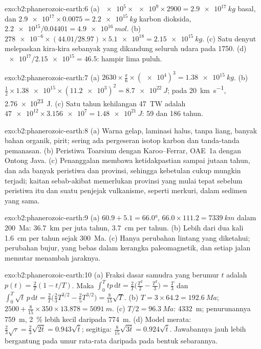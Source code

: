\begin{solution}{exo:b2:phanerozoic-earth:6}
(a) $\num{e5} \times \num{e9} \times 2900 = \qty{2.9e17}{kg}$ basal, dan $\num{2.9e17}
\times 0.0075 = \qty{2.2e15}{kg}$ karbon dioksida, $\num{2.2e15}/0.04401 = \qty{4.9e16}{mol}$.
(b) $\num{278e-6} \times (44.01/28.97) \times \num{5.1e18} = \qty{2.15e15}{kg}$. (c) Satu denyut
melepaskan kira-kira sebanyak yang dikandung seluruh udara pada 1750. (d) $\num{e17}/\num{2.15e15} = 46.5$: hampir lima puluh.
\end{solution}

\begin{solution}{exo:b2:phanerozoic-earth:7}
(a) $2630 \times \frac{\pi}{6} \times (\num{e4})^3 = \qty{1.38e15}{kg}$. (b) $\tfrac12 \times
\num{1.38e15} \times (\num{11.2e3})^2 = \qty{8.7e22}{J}$; pada \qty{20}{km.s^{-1}},
\qty{2.76e23}{J}. (c) Satu tahun kehilangan \qty{47}{TW} adalah $\num{47e12} \times \num{3.156e7} =
\qty{1.48e21}{J}$: 59 dan 186 tahun.
\end{solution}

\begin{solution}{exo:b2:phanerozoic-earth:8}
(a) Warna gelap, laminasi halus, tanpa liang, banyak bahan organik, pirit; sering ada pergeseran
isotop karbon dan tanda-tanda pemanasan. (b) Peristiwa Toarsium dengan Karoo--Ferrar, OAE~1a dengan
Ontong Java. (c) Penanggalan membawa ketidakpastian sampai jutaan tahun, dan ada banyak peristiwa dan
provinsi, sehingga kebetulan cukup mungkin terjadi; kaitan sebab-akibat memerlukan provinsi yang mulai
tepat sebelum peristiwa itu dan suatu penjejak vulkanisme, seperti merkuri, dalam sedimen yang sama.
\end{solution}

\begin{solution}{exo:b2:phanerozoic-earth:9}
(a) $60.9 + 5.1 = \ang{66.0}$, $66.0 \times 111.2 = \qty{7339}{km}$ dalam \qty{200}{Ma}:
\qty{36.7}{km} per juta tahun, \qty{3.7}{cm} per tahun. (b) Lebih dari dua kali
\qty{1.6}{cm} per tahun sejak \qty{300}{Ma}. (c) Hanya perubahan lintang yang diketahui; perubahan
bujur, yang bebas dalam kerangka paleomagnetik, dan setiap jalan memutar menambah jaraknya.
\end{solution}

\begin{solution}{exo:b2:phanerozoic-earth:10}
(a) Fraksi dasar samudra yang berumur $t$ adalah $p(t) = \frac2T(1 - t/T)$. Maka $\int_0^T tp\,\mathrm{d}t =
\frac2T\bigl(\frac{T^2}2 - \frac{T^2}3\bigr) = \frac T3$ dan $\int_0^T \sqrt t\,p\,\mathrm{d}t =
\frac2T\bigl(\frac23 T^{3/2} - \frac25 T^{3/2}\bigr) = \frac8{15}\sqrt T$. (b) $T = 3 \times 64.2 =
\qty{192.6}{Ma}$; $2500 + \frac8{15} \times 350 \times 13.878 = \qty{5091}{m}$. (c) $T/2 =
\qty{96.3}{Ma}$: \qty{4332}{m}; penurunannya \qty{759}{m}, \qty{2}{\percent} lebih kecil daripada
\qty{774}{m}. (d) Model merata: $\frac23\sqrt\tau = \frac23\sqrt{2\bar t} = 0.943\sqrt{\bar t}$;
segitiga: $\frac8{15}\sqrt{3\bar t} = 0.924\sqrt{\bar t}$. Jawabannya jauh lebih bergantung pada umur rata-rata
daripada pada bentuk sebarannya.
\end{solution}

